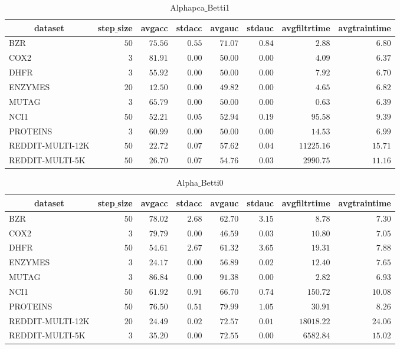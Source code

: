 \documentclass[]{article}
\begin{document}
\begin{table}[!tbp]
\caption{Alphapca$\_$Betti1\label{Alphapca_Betti1}} 
{\centering
\begin{tabular}{lrrrrrrr}
\hline\hline
\multicolumn{1}{c}{dataset}&\multicolumn{1}{c}{step$\_$size}&\multicolumn{1}{c}{avgacc}&\multicolumn{1}{c}{stdacc}&\multicolumn{1}{c}{avgauc}&\multicolumn{1}{c}{stdauc}&\multicolumn{1}{c}{avgfiltrtime}&\multicolumn{1}{c}{avgtraintime}\tabularnewline
\hline
BZR&$50$&$75.56$&$0.55$&$71.07$&$0.84$&$    2.88$&$ 6.80$\tabularnewline
COX2&$ 3$&$81.91$&$0.00$&$50.00$&$0.00$&$    4.09$&$ 6.37$\tabularnewline
DHFR&$ 3$&$55.92$&$0.00$&$50.00$&$0.00$&$    7.92$&$ 6.70$\tabularnewline
ENZYMES&$20$&$12.50$&$0.00$&$49.82$&$0.00$&$    4.65$&$ 6.82$\tabularnewline
MUTAG&$ 3$&$65.79$&$0.00$&$50.00$&$0.00$&$    0.63$&$ 6.39$\tabularnewline
NCI1&$50$&$52.21$&$0.05$&$52.94$&$0.19$&$   95.58$&$ 9.39$\tabularnewline
PROTEINS&$ 3$&$60.99$&$0.00$&$50.00$&$0.00$&$   14.53$&$ 6.99$\tabularnewline
REDDIT-MULTI-12K&$50$&$22.72$&$0.07$&$57.62$&$0.04$&$11225.16$&$15.71$\tabularnewline
REDDIT-MULTI-5K&$50$&$26.70$&$0.07$&$54.76$&$0.03$&$ 2990.75$&$11.16$\tabularnewline
\hline
\end{tabular}}
\end{table}
\begin{table}[!tbp]
\caption{Alpha$\_$Betti0\label{Alpha_Betti0}} 
{\centering
\begin{tabular}{lrrrrrrr}
\hline\hline
\multicolumn{1}{c}{dataset}&\multicolumn{1}{c}{step$\_$size}&\multicolumn{1}{c}{avgacc}&\multicolumn{1}{c}{stdacc}&\multicolumn{1}{c}{avgauc}&\multicolumn{1}{c}{stdauc}&\multicolumn{1}{c}{avgfiltrtime}&\multicolumn{1}{c}{avgtraintime}\tabularnewline
\hline
BZR&$50$&$78.02$&$2.68$&$62.70$&$3.15$&$    8.78$&$ 7.30$\tabularnewline
COX2&$ 3$&$79.79$&$0.00$&$46.59$&$0.03$&$   10.80$&$ 7.05$\tabularnewline
DHFR&$50$&$54.61$&$2.67$&$61.32$&$3.65$&$   19.31$&$ 7.88$\tabularnewline
ENZYMES&$ 3$&$24.17$&$0.00$&$56.89$&$0.02$&$   12.40$&$ 7.65$\tabularnewline
MUTAG&$ 3$&$86.84$&$0.00$&$91.38$&$0.00$&$    2.82$&$ 6.93$\tabularnewline
NCI1&$50$&$61.92$&$0.91$&$66.70$&$0.74$&$  150.72$&$10.08$\tabularnewline
PROTEINS&$50$&$76.50$&$0.51$&$79.99$&$1.05$&$   30.91$&$ 8.26$\tabularnewline
REDDIT-MULTI-12K&$20$&$24.49$&$0.02$&$72.57$&$0.01$&$18018.22$&$24.06$\tabularnewline
REDDIT-MULTI-5K&$ 3$&$35.20$&$0.00$&$72.55$&$0.00$&$ 6582.84$&$15.02$\tabularnewline
\hline
\end{tabular}}
\end{table}
\end{document}
